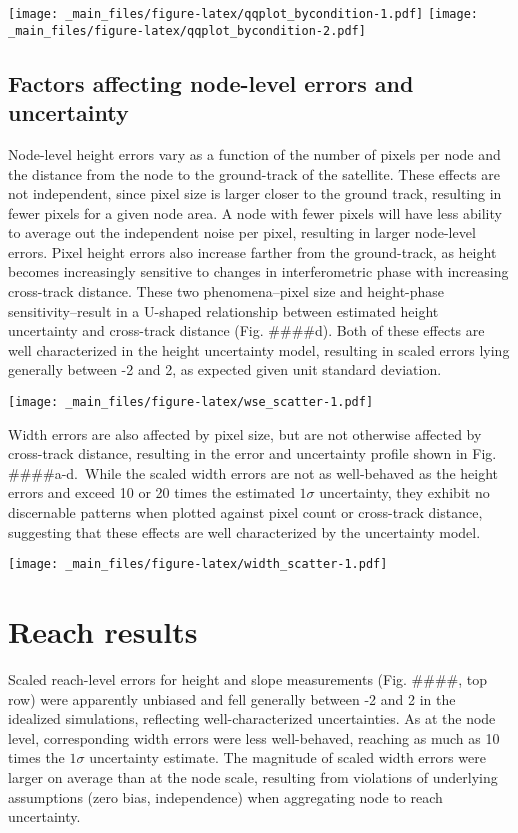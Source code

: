 \documentclass[]{book}
\begin{document}
\texttt{[image: \_main\_files/figure-latex/qqplot\_bycondition-1.pdf]} \texttt{[image: \_main\_files/figure-latex/qqplot\_bycondition-2.pdf]}

\hypertarget{factors-affecting-node-level-errors-and-uncertainty}{%
\subsection{Factors affecting node-level errors and uncertainty}\label{factors-affecting-node-level-errors-and-uncertainty}}

Node-level height errors vary as a function of the number of pixels per node and the distance from the node to the ground-track of the satellite. These effects are not independent, since pixel size is larger closer to the ground track, resulting in fewer pixels for a given node area. A node with fewer pixels will have less ability to average out the independent noise per pixel, resulting in larger node-level errors. Pixel height errors also increase farther from the ground-track, as height becomes increasingly sensitive to changes in interferometric phase with increasing cross-track distance. These two phenomena--pixel size and height-phase sensitivity--result in a U-shaped relationship between estimated height uncertainty and cross-track distance (Fig. \#\#\#\#d). Both of these effects are well characterized in the height uncertainty model, resulting in scaled errors lying generally between -2 and 2, as expected given unit standard deviation.

\texttt{[image: \_main\_files/figure-latex/wse\_scatter-1.pdf]}

Width errors are also affected by pixel size, but are not otherwise affected by cross-track distance, resulting in the error and uncertainty profile shown in Fig. \#\#\#\#a-d.~While the scaled width errors are not as well-behaved as the height errors and exceed 10 or 20 times the estimated \(1\sigma\) uncertainty, they exhibit no discernable patterns when plotted against pixel count or cross-track distance, suggesting that these effects are well characterized by the uncertainty model.

\texttt{[image: \_main\_files/figure-latex/width\_scatter-1.pdf]}

\hypertarget{reach-results}{%
\section{Reach results}\label{reach-results}}

Scaled reach-level errors for height and slope measurements (Fig. \#\#\#\#, top row) were apparently unbiased and fell generally between -2 and 2 in the idealized simulations, reflecting well-characterized uncertainties. As at the node level, corresponding width errors were less well-behaved, reaching as much as 10 times the \(1\sigma\) uncertainty estimate. The magnitude of scaled width errors were larger on average than at the node scale, resulting from violations of underlying assumptions (zero bias, independence) when aggregating node to reach uncertainty.
\end{document}
